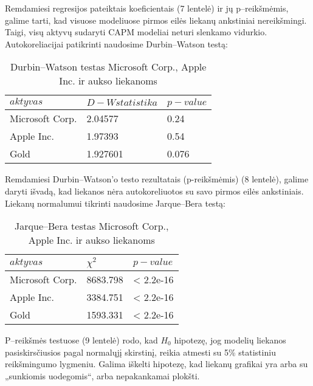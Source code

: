 \documentclass[12pt, a14paper, lithuanian]{article}
\begin{document}
Remdamiesi regresijos pateiktais koeficientais (7 lentelė) ir jų p--reikšmėmis, galime tarti, kad visuose modeliuose pirmos eilės liekanų ankstiniai nereikšmingi. Taigi, visų aktyvų sudaryti CAPM modeliai neturi slenkamo vidurkio.\\

Autokoreliacijai patikrinti naudosime Durbin--Watson testą:



\begin{table}[ht]
\begin{center}
    \begin{tabular}{ | l | l | l | }
    \hline
    $ aktyvas $ & $ D-W statistika $ & $ p-value $  \\
    \hline
	Microsoft Corp. & 2.04577 &  0.24\\
	Apple Inc. & 1.97393 &  0.54\\
	Gold & 1.927601 &  0.076\\
	\hline
    \end{tabular}
\end{center}
\caption{Durbin--Watson testas Microsoft Corp., Apple Inc. ir aukso liekanoms}
\end{table}

Remdamiesi Durbin--Watson'o testo rezultatais (p-reikšmėmis) (8 lentelė), galime daryti išvadą, kad liekanos nėra autokoreliuotos su savo pirmos eilės ankstiniais.\\

Liekanų normalumui tikrinti naudosime Jarque--Bera testą:



\begin{table}[ht]
\begin{center}
    \begin{tabular}{ | l | l | l | }
    \hline
    $ aktyvas $ &  $ \chi^2 $  & $ p-value $  \\
    \hline
	Microsoft Corp. & 8683.798 & < 2.2e-16\\
	Apple Inc. & 3384.751 & < 2.2e-16\\
	Gold & 1593.331 & < 2.2e-16\\
	\hline
    \end{tabular}
\end{center}
\caption{Jarque--Bera testas Microsoft Corp., Apple Inc. ir aukso liekanoms}
\end{table}

P--reikšmės testuose (9 lentelė) rodo, kad $H_0$ hipotezę, jog modelių liekanos pasiskirsčiusios pagal normalųjį skirstinį, reikia atmesti su 5\% statistiniu reikšmingumo lygmeniu. Galima iškelti hipotezę, kad liekanų grafikai yra arba su „sunkiomis uodegomis“, arba nepakankamai plokšti. 
\end{document}
